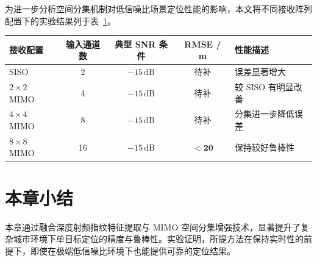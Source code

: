 为进一步分析空间分集机制对低信噪比场景定位性能的影响，本文将不同接收阵列配置下的实验结果列于表~\ref{tab:mimo_comparison_ch3}。

\begin{table}[htbp]
    \centering
    \label{tab:mimo_comparison_ch3}
    \begin{tabular}{@{}lcccl@{}}
        \toprule
        \textbf{接收配置} & \textbf{输入通道数} & \textbf{典型 SNR 条件} & \textbf{RMSE / m} & \textbf{性能描述} \\ \midrule
        SISO & 2 & $-15\,\text{dB}$ & 待补 & 误差显著增大 \\
        $2\times 2$ MIMO & 4 & $-15\,\text{dB}$ & 待补 & 较 SISO 有明显改善 \\
        $4\times 4$ MIMO & 8 & $-15\,\text{dB}$ & 待补 & 分集进一步降低误差 \\
        $8\times 8$ MIMO & 16 & $-15\,\text{dB}$ & $\mathbf{< 20}$ & 保持较好鲁棒性 \\ \bottomrule
    \end{tabular}
\end{table}

\section{本章小结}

本章通过融合深度射频指纹特征提取与 MIMO 空间分集增强技术，显著提升了复杂城市环境下单目标定位的精度与鲁棒性。实验证明，所提方法在保持实时性的前提下，即使在极端低信噪比环境下也能提供可靠的定位结果。
